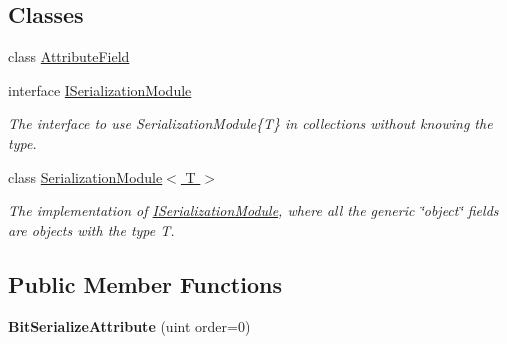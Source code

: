 \subsection*{Classes}
\begin{DoxyCompactItemize}
\item 
class \hyperlink{class_skyrates_1_1_util_1_1_serializing_1_1_bit_serialize_attribute_1_1_attribute_field}{Attribute\-Field}
\item 
interface \hyperlink{interface_skyrates_1_1_util_1_1_serializing_1_1_bit_serialize_attribute_1_1_i_serialization_module}{I\-Serialization\-Module}
\begin{DoxyCompactList}\small\item\em The interface to use Serialization\-Module\{\-T\} in collections without knowing the type. \end{DoxyCompactList}\item 
class \hyperlink{class_skyrates_1_1_util_1_1_serializing_1_1_bit_serialize_attribute_1_1_serialization_module_3_01_t_01_4}{Serialization\-Module$<$ T $>$}
\begin{DoxyCompactList}\small\item\em The implementation of \hyperlink{interface_skyrates_1_1_util_1_1_serializing_1_1_bit_serialize_attribute_1_1_i_serialization_module}{I\-Serialization\-Module}, where all the generic \char`\"{}object\char`\"{} fields are objects with the type T. \end{DoxyCompactList}\end{DoxyCompactItemize}
\subsection*{Public Member Functions}
\begin{DoxyCompactItemize}
\item 
\hypertarget{class_skyrates_1_1_util_1_1_serializing_1_1_bit_serialize_attribute_a0bebc7a7a0f6174b52ba306cdb3c623f}{{\bfseries Bit\-Serialize\-Attribute} (uint order=0)}\label{class_skyrates_1_1_util_1_1_serializing_1_1_bit_serialize_attribute_a0bebc7a7a0f6174b52ba306cdb3c623f}

\end{DoxyCompactItemize}
